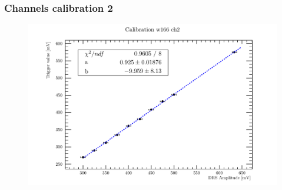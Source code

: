 
\begin{frame} [fragile]
\small
	\frametitle{Channels calibration 2}
    		\begin{figure}
		 \centering
			\includegraphics[scale=0.5]{figures/ch2.pdf}
		\end{figure}  
\end{frame}
